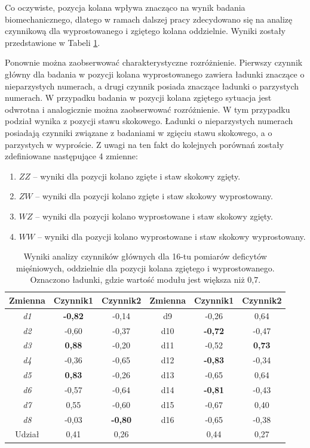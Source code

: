 Co oczywiste, pozycja kolana wpływa znacząco na wynik badania biomechanicznego, dlatego w ramach dalszej pracy zdecydowano się na  analizę czynnikową dla wyprostowanego i zgiętego kolana oddzielnie. Wyniki zostały przedstawione w Tabeli \ref{tab:pca-muscles-knee-strait-bended}. 

Ponownie można zaobserwować charakterystyczne rozróżnienie. Pierwszy czynnik główny dla badania w pozycji kolana wyprostowanego zawiera ładunki znaczące o nieparzystych numerach, a drugi czynnik posiada znaczące ładunki o parzystych numerach. W przypadku badania w pozycji kolana zgiętego sytuacja jest odwrotna i analogicznie można zaobserwować rozróżnienie. W tym przypadku podział wynika z pozycji stawu skokowego. Ładunki o nieparzystych numerach posiadają czynniki związane z badaniami w zgięciu stawu skokowego, a o parzystych w wyproście. Z uwagi na ten fakt do kolejnych porównań zostały zdefiniowane następujące 4 zmienne:
\begin{enumerate}
	\item $ZZ$ -- wyniki dla pozycji kolano zgięte i staw skokowy zgięty.
	\item $ZW$ -- wyniki dla pozycji kolano zgięte i staw skokowy wyprostowany.
	\item $WZ$ -- wyniki dla pozycji kolano wyprostowane i staw skokowy zgięty.
	\item $WW$ -- wyniki dla pozycji kolano wyprostowane i staw skokowy wyprostowany.
\end{enumerate} 
\begin{table}[h!]
	\centering
	\setlength{\tabcolsep}{3pt}
	\setlength\extrarowheight{2pt}
	\caption{Wyniki analizy czynników głównych dla 16-tu pomiarów deficytów mięśniowych, oddzielnie dla pozycji kolana zgiętego i wyprostowanego. Oznaczono ładunki, gdzie wartość modułu jest większa niż 0,7.}
	\label{tab:pca-muscles-knee-strait-bended}
	\begin{tabular}{c|c|c||c|c|c}
		
		Zmienna&Czynnik1&Czynnik2&Zmienna&Czynnik1&Czynnik2 \\
		\hline \hline
		\textit{d1}&\textbf{-0,82}&-0,14&d9&-0,26&0,64 \\
		\hline
		\textit{d2}&-0,60&-0,37&d10&\textbf{-0,72}&-0,47 \\
		\hline
		\textit{d3}&\textbf{0,88}&-0,20&d11&-0,52&\textbf{0,73} \\
		\hline
		\textit{d4}&-0,36&-0,65&d12&\textbf{-0,83}&-0,34 \\
		\hline
		\textit{d5}&\textbf{0,83}&-0,26&d13&-0,65&0,64 \\
		\hline
		\textit{d6}&-0,57&-0,64&d14&\textbf{-0,81}&-0,43 \\
		\hline
		\textit{d7}&0,55&-0,60&d15&-0,67&0,40 \\
		\hline
		\textit{d8}&-0,03&\textbf{-0,80}&d16&-0,65&-0,38 \\
		\hline\hline
		Udział&0,41&0,26&&0,44&0,27 \\
		
	\end{tabular}
\end{table}

